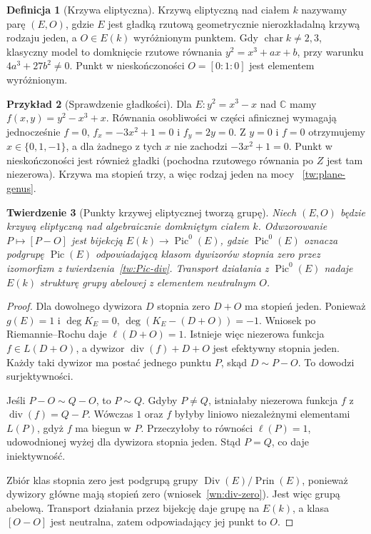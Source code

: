 \documentclass[11pt,a4paper,openany]{report}
\numberwithin{equation}{section}
\theoremstyle{plain}
\newtheorem{twierdzenie}{Twierdzenie}[section]
\theoremstyle{definition}
\newtheorem{definicja}[twierdzenie]{Definicja}
\newtheorem{przyklad}[twierdzenie]{Przykład}
\theoremstyle{remark}
\newcommand{\C}{\mathbb C}
\begin{document}
\begin{definicja}[Krzywa eliptyczna]
Krzywą eliptyczną nad ciałem $k$ nazywamy
parę $(E,O)$, gdzie $E$ jest gładką
rzutową geometrycznie nierozkładalną krzywą
rodzaju jeden, a $O\in E(k)$ wyróżnionym
punktem. Gdy $\operatorname{char}k\ne2,3$,
klasyczny model to domknięcie rzutowe równania
$y^2=x^3+ax+b$, przy warunku
$4a^3+27b^2\ne0$. Punkt w nieskończoności
$O=[0:1:0]$ jest elementem wyróżnionym.
\end{definicja}

\begin{przyklad}[Sprawdzenie gładkości]
Dla $E:y^2=x^3-x$ nad $\C$ mamy
$f(x,y)=y^2-x^3+x$. Równania osobliwości
w części afinicznej wymagają jednocześnie
$f=0$, $f_x=-3x^2+1=0$ i $f_y=2y=0$.
Z $y=0$ i $f=0$ otrzymujemy
$x\in\{0,1,-1\}$, a dla żadnego z tych $x$
nie zachodzi $-3x^2+1=0$. Punkt w nieskończoności
jest również gładki (pochodna rzutowego równania
po $Z$ jest tam niezerowa). Krzywa ma stopień trzy,
a więc rodzaj jeden na mocy
~\ref{tw:plane-genus}.
\end{przyklad}

\begin{twierdzenie}[Punkty krzywej eliptycznej tworzą grupę]
\label{tw:elliptic-group}
Niech $(E,O)$ będzie krzywą eliptyczną nad
algebraicznie domkniętym ciałem $k$.
Odwzorowanie $P\mapsto[P-O]$ jest bijekcją
$E(k)\to\operatorname{Pic}^0(E)$, gdzie
$\operatorname{Pic}^0(E)$ oznacza podgrupę
$\operatorname{Pic}(E)$ odpowiadającą klasom
dywizorów stopnia zero przez izomorfizm
z twierdzenia~\ref{tw:Pic-div}.
Transport działania z $\operatorname{Pic}^0(E)$
nadaje $E(k)$ strukturę grupy abelowej
z elementem neutralnym $O$.
\end{twierdzenie}
\begin{proof}
Dla dowolnego dywizora $D$ stopnia zero
$D+O$ ma stopień jeden. Ponieważ $g(E)=1$
i $\deg K_E=0$,
$\deg(K_E-(D+O))=-1$. Wniosek po Riemannie--Rochu
daje $\ell(D+O)=1$. Istnieje więc niezerowa funkcja
$f\in L(D+O)$, a dywizor
$\operatorname{div}(f)+D+O$ jest efektywny
stopnia jeden. Każdy taki dywizor ma postać
jednego punktu $P$, skąd $D\sim P-O$.
To dowodzi surjektywności.

Jeśli $P-O\sim Q-O$, to $P\sim Q$.
Gdyby $P\ne Q$, istniałaby niezerowa funkcja
$f$ z $\operatorname{div}(f)=Q-P$.
Wówczas $1$ oraz $f$ byłyby liniowo niezależnymi
elementami $L(P)$, gdyż $f$ ma biegun w $P$.
Przeczyłoby to równości $\ell(P)=1$,
udowodnionej wyżej dla dywizora stopnia jeden.
Stąd $P=Q$, co daje iniektywność.

Zbiór klas stopnia zero jest podgrupą grupy
$\operatorname{Div}(E)/\operatorname{Prin}(E)$,
ponieważ dywizory główne mają stopień zero
(wniosek~\ref{wn:div-zero}). Jest więc grupą
abelową. Transport działania przez bijekcję
daje grupę na $E(k)$, a klasa $[O-O]$ jest
neutralna, zatem odpowiadający jej punkt to $O$.
\end{proof}
\end{document}

